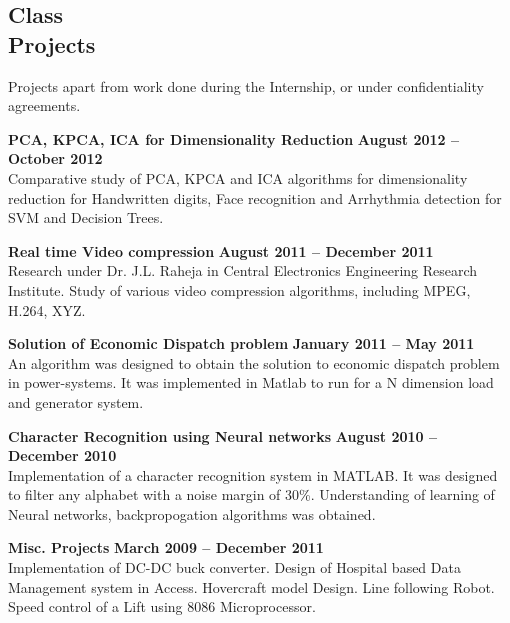 \documentclass[margin,line]{resume}
\begin{document}
\begin{resume}
    \section{\mysidestyle Class\\Projects}

    Projects apart from work done during the Internship, or under confidentiality agreements.

    \textbf{PCA, KPCA, ICA for Dimensionality Reduction} \hfill \textbf{August 2012 -- October 2012}\\
    Comparative study of PCA, KPCA and ICA algorithms for dimensionality reduction for Handwritten digits, Face recognition and Arrhythmia detection for SVM and Decision Trees.

    \textbf{Real time Video compression} \hfill \textbf{August 2011 -- December 2011}\\
    Research under Dr. J.L. Raheja in Central Electronics Engineering Research Institute. Study of various video compression
    algorithms, including MPEG, H.264, XYZ.

    \textbf{Solution of Economic Dispatch problem} \hfill \textbf{January 2011 -- May 2011}\\
    An algorithm was designed to obtain the solution to economic dispatch problem in power-systems. It was implemented in Matlab
    to run for a N dimension load and generator system.
    
    \textbf{Character Recognition using Neural networks} \hfill \textbf{August 2010 -- December 2010}\\
    Implementation of a character recognition system in MATLAB. It was designed to filter any alphabet with a noise margin of 
    30\%. Understanding of learning of Neural networks, backpropogation algorithms was obtained.

    \textbf{Misc. Projects} \hfill \textbf{March 2009 -- December 2011}\\
    Implementation of DC-DC buck converter. Design of Hospital based Data Management system in Access. Hovercraft model Design.
    Line following Robot. Speed control of a Lift using 8086 Microprocessor.






\end{resume}
\end{document}
